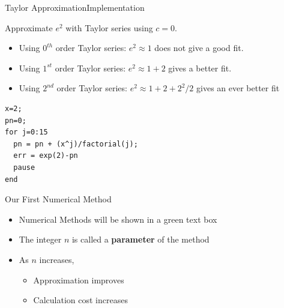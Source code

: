 \documentclass[10pt]{beamer}
\begin{document}
\begin{frame}[fragile]{Taylor Approximation}{Implementation}
\begin{example}
Approximate $e^2$ with Taylor series using $c=0$.     
\end{example}

\begin{itemize}
  \item Using $0^{th}$ order Taylor series: $e^2 \approx 1$ does not
give a good fit.
  \item Using $1^{st}$ order Taylor series: $e^2 \approx 1 + 2$ gives a
better fit.
  \item Using $2^{nd}$ order Taylor series: $e^2 \approx 1 + 2 + 2^2/2$ gives an ever better fit
\end{itemize}
\begin{lstlisting}
x=2;
pn=0;
for j=0:15
  pn = pn + (x^j)/factorial(j);
  err = exp(2)-pn
  pause
end
\end{lstlisting}
\end{frame}
\begin{frame}{Our First Numerical Method}

\bigskip
\begin{itemize}
    \item Numerical Methods will be shown in a green text box 
    \item The integer $n$ is called a \textbf{parameter} of the method
    \item As $n$ increases, 
    \begin{itemize}
        \item Approximation improves
        \item Calculation cost increases
    \end{itemize}
\end{itemize}
\end{frame}

\end{document}

